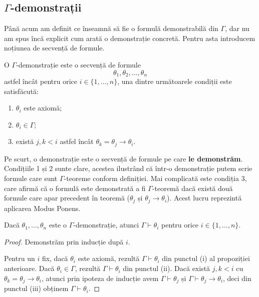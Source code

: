 \subsection{\( \Gamma \)-demonstrații}

Până acum am definit ce înseamnă să fie o formulă demonstrabilă din \( \Gamma \), dar nu am spus încă explicit cum arată o demonstrație concretă.
Pentru asta introducem noțiunea de secvență de formule.

\begin{definition}
	O \( \Gamma \)-demonstrație este o secvență de formule
	\[
		\theta_1, \theta_2, \dots, \theta_n
	\]
	astfel încât pentru orice \( i \in \{1, \dots, n\} \), una dintre următoarele condiții este satisfăcută:
	\begin{enumerate}
		\item \( \theta_i \) este axiomă;
		\item \( \theta_i \in \Gamma \);
		\item există \( j, k < i \) astfel încât \( \theta_k = \theta_j \to \theta_i \).
	\end{enumerate}
\end{definition}

Pe scurt, o demonstrație este o secvență de formule pe care \textbf{le demonstrăm}. Condițiile 1 și 2 sunte clare, acestea ilustrând că într-o demonstrație
putem scrie formule care sunt \( \Gamma \)-teoreme conform definiției. Mai complicată este condiția 3, care afirmă că o formulă este demonstrată
a fi \( \Gamma \)-teoremă dacă există două formule care apar precedent în teoremă (\( \theta_j \) și \( \theta_j \to \theta_i \)). Acest lucru reprezintă aplicarea
Modus Ponens.

\begin{lemma}
	Dacă \( \theta_1, \dots, \theta_n \) este o \( \Gamma \)-demonstrație, atunci \( \Gamma \vdash \theta_i \) pentru orice \( i \in \{1, \dots, n\} \).
\end{lemma}

\begin{proof}
	Demonstrăm prin inducție după \( i \).

	Pentru un \( i \) fix, dacă \( \theta_i \) este axiomă, rezultă \( \Gamma \vdash \theta_i \) din punctul (i) al propoziției anterioare.
	Dacă \( \theta_i \in \Gamma \), rezultă \( \Gamma \vdash \theta_i \) din punctul (ii).
	Dacă există \( j, k < i \) cu \( \theta_k = \theta_j \to \theta_i \), atunci prin ipoteza de inducție avem
	\( \Gamma \vdash \theta_j \) și \( \Gamma \vdash \theta_j \to \theta_i \), deci din punctul (iii) obținem \( \Gamma \vdash \theta_i \).
\end{proof}

